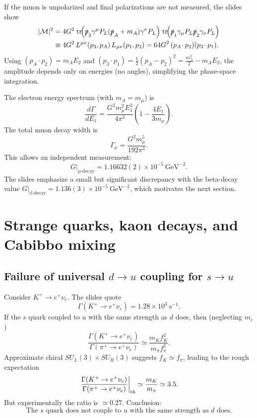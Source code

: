 If the muon is unpolarized and final polarizations are not measured, the slides show
\begin{align}
|\mathcal{M}|^2
&=
4G^2\;
\mathrm{tr}\!\Big(\slashed{p}_3\gamma^\mu P_L(\slashed{p}_A+m_A)\gamma^\nu P_L\Big)\;
\mathrm{tr}\!\Big(\slashed{p}_1\gamma_\mu P_L\slashed{p}_2\gamma_\nu P_L\Big)\\
&\equiv
4G^2\,L^{\mu\nu}(p_3,p_A)\,L_{\mu\nu}(p_1,p_2)
=
64G^2\,(p_A\!\cdot p_2)(p_3\!\cdot p_1).
\end{align}
Using $(p_A\!\cdot p_2)=m_A E_2$ and $(p_3\!\cdot p_1)=\frac12(p_A-p_2)^2=\frac{m_A^2}{2}-m_AE_2$,
the amplitude depends only on energies (no angles), simplifying the phase-space integration.

The electron energy spectrum (with $m_A=m_\mu$) is
\begin{equation}
\boxed{
\frac{d\Gamma}{dE_1}
=
\frac{G^2 m_\mu^2 E_1^2}{4\pi^3}\left(1-\frac{4E_1}{3m_\mu}\right).
}
\end{equation}
The total muon decay width is
\begin{equation}
\boxed{
\Gamma_\mu
=
\frac{G^2 m_\mu^5}{192\pi^3}.
}
\end{equation}
This allows an independent measurement:
\begin{equation}
G\big|_{\mu\text{-decay}}=1.16632(2)\times 10^{-5}~\text{GeV}^{-2}.
\end{equation}
The slides emphasize a small but significant discrepancy with the beta-decay value
$G\big|_{\beta\text{-decay}}=1.136(3)\times 10^{-5}~\text{GeV}^{-2}$, which motivates the next section.

\section{Strange quarks, kaon decays, and Cabibbo mixing}
\subsection{Failure of universal $d\to u$ coupling for $s\to u$}
Consider $K^+\to e^+\nu_e$. The slides quote
\begin{equation}
\Gamma(K^+\to e^+\nu_e)=1.28\times 10^3~\text{s}^{-1}.
\end{equation}
If the $s$ quark coupled to $u$ with the same strength as $d$ does, then (neglecting $m_e$)
\begin{equation}
\frac{\Gamma(K^+\to e^+\nu_e)}{\Gamma(\pi^+\to e^+\nu_e)}
\simeq
\frac{m_K f_K^2}{m_\pi f_\pi^2}.
\end{equation}
Approximate chiral $SU_L(3)\times SU_R(3)$ suggests $f_K\simeq f_\pi$, leading to the rough expectation
\begin{equation}
\left.\frac{\Gamma(K^+\to e^+\nu_e)}{\Gamma(\pi^+\to e^+\nu_e)}\right|_{\rm th}
\simeq
\frac{m_K}{m_\pi}\simeq 3.5.
\end{equation}
But experimentally the ratio is $\simeq 0.27$. Conclusion:
\begin{equation}
\boxed{\text{The $s$ quark does not couple to $u$ with the same strength as $d$ does.}}
\end{equation}

